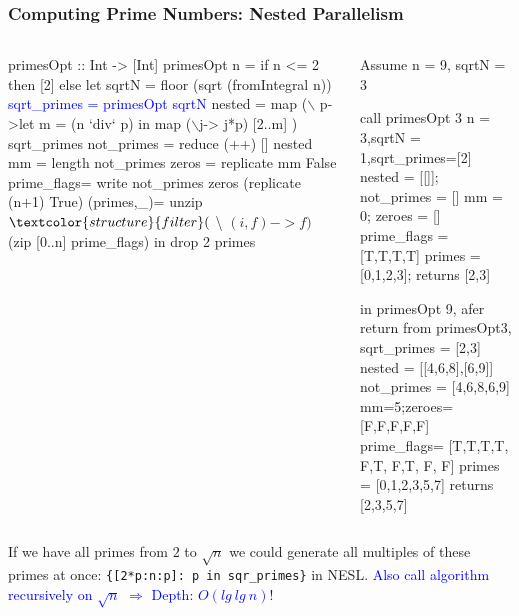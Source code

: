 \documentclass{beamer}
\newcommand{\blue}[1]{\textcolor{Blue}{{#1}}}
\renewcommand{\emph}[1]{\textcolor{structure}{#1}}
\newcommand{\emp}[1]{\textcolor{DikuRed}{ #1}}
\newcommand{\mymath}[1]{$ #1 $}
\begin{document}
\begin{frame}[fragile,t]
  \frametitle{Computing Prime Numbers: Nested Parallelism}

\begin{columns}
\begin{colorcode}[fontsize=\scriptsize]
primesOpt :: Int -> [Int]
primesOpt n = 
  if n <= 2 then [2]
  else 
   let sqrtN = floor (sqrt (fromIntegral n))
       \blue{sqrt_primes = primesOpt sqrtN}
       nested = \emp{map} (\mymath{\backslash}\emp{p}->let m = (n `div` p) 
                         in  \emp{map} (\mymath{\backslash}j-> j*p)
                                 [2..m]
                    ) \emp{sqrt_primes}
       not_primes  = \emph{reduce} (++) [] nested
       mm = length not_primes
       zeros = \emph{replicate} mm False 
       prime_flags= \emph{write} not_primes zeros 
                    \emph{(replicate} (n+1) True)
       (primes,_)= unzip $ \emph{filter} (\mymath{\backslash}(i,f)->f) 
                    $ (zip [0..n] prime_flags)
   in drop 2 primes
\end{colorcode}
\pause
\begin{colorcode}[fontsize=\scriptsize]
Assume n = 9, sqrtN = 3 

call primesOpt 3
n = 3,sqrtN = 1,sqrt_primes=[2]
nested = [[]]; not\_primes = [] 
mm = 0; zeroes = []
prime_flags = [T,T,T,T]
primes = [0,1,2,3]; returns [2,3]

in primesOpt 9, afer 
return from primesOpt3,
sqrt_primes = [2,3]
nested = [[4,6,8],[6,9]]
not_primes = [4,6,8,6,9]
mm=5;zeroes= [F,F,F,F,F]
prime_flags= [T,T,T,T,\emp{F},T,\emp{F},T,\emp{F},\emp{F}]
primes = [0,1,2,3,5,7]
returns [2,3,5,7]
\end{colorcode}
\end{columns}
\medskip

If we have all primes from $2$ to $\sqrt{n}$ we could
generate all multiples of these primes at once:
\emp{\tt \{[2*p:n:p]: p in sqr\_primes\}} in NESL.
\blue{Also call algorithm recursively on $\sqrt{n}$ $\Rightarrow$ Depth: $O(lg \ lg \ n)$!}
\end{frame}
\end{document}
